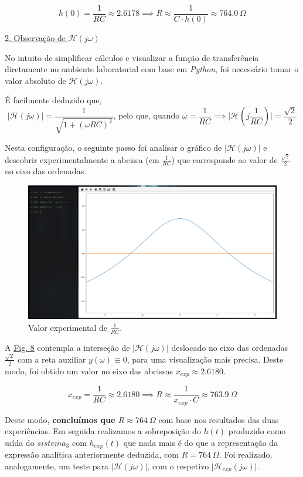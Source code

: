 \[h(0) = \frac{1}{RC} \approx 2.6178 \implies R \approx \frac{1}{C \cdot h(0)} \approx 764.0\ \Omega \]

\clearpage

\begin{normalsize}
\underline{2. Observação de \(\mathcal{H}(j\omega)\)}
\vspace{0.25cm}
\end{normalsize}

No intuito de simplificar cálculos e visualizar a função de transferência diretamente no ambiente laboratorial com base em \textit{Python}, foi necessário tomar o valor absoluto de \(\mathcal{H}(j\omega)\).

É facilmente deduzido que, 
\[\vert \mathcal{H}(j\omega)\vert = \frac{1}{\sqrt{1 + (\omega RC)^2}}\text{, pelo que, quando }\omega = \frac{1}{RC} \implies \vert \mathcal{H}(j\frac{1}{RC})\vert = \frac{\sqrt{2}}{2}\]

Nesta configuração, o seguinte passo foi analisar o gráfico de \(\vert \mathcal{H}(j\omega)\vert\) e descobrir experimentalmente a abcissa (em \(\frac{1}{RC}\)) que corresponde ao valor de \(\frac{\sqrt{2}}{2}\) no eixo das ordenadas.

\begin{figure}[H]
    \centering
    \includegraphics[width = 0.5\linewidth]{prints/transf_ht.png}
    \caption{Valor experimental de \(\frac{1}{RC}\).}
    \label{fig:transf_ht}
\end{figure}

A \hyperref[fig:transf_ht]{Fig. 8} contempla a interseção de \(\vert \mathcal{H}(j\omega)\vert \) deslocado no eixo das ordenadas \(\frac{\sqrt{2}}{2}\) com a reta auxiliar \(y(\omega) \equiv 0\), para uma visualização mais precisa. Deste modo, foi obtido um valor no eixo das abcissas \(x_{exp} \approx 2.6180\).

\[x_{exp} = \frac{1}{RC} \approx 2.6180 \implies R \approx \frac{1}{x_{exp} \cdot C} \approx 763.9\ \Omega\]

\clearpage 

Deste modo, \textbf{concluímos que \(R \approx 764\ \Omega\)} com base nos resultados das duas experiências\footnotemark[5]. Em seguida realizamos a sobreposição do \(h(t)\) produzido como saída do \(sistema_3\) com \(h_{exp}(t)\) que nada mais é do que a representação da expressão analítica anteriormente deduzida, com \(R = 764\ \Omega\). Foi realizado, analogamente, um teste para \(\vert \mathcal{H}(j\omega)\vert \), com o respetivo \(\vert \mathcal{H}_{exp}(j\omega)\vert \).

